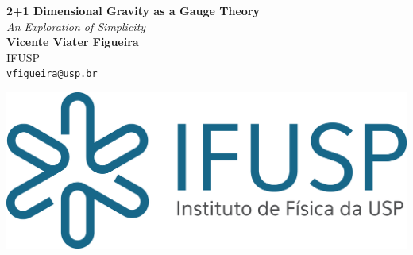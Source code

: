 \documentclass[a0,portrait]{a0poster}
\begin{document}
\nocite{*}



\begin{minipage}[b]{0.71\linewidth}
\veryHuge \color{NavyBlue} \textbf{2+1 Dimensional Gravity as a Gauge Theory} \color{Black}\\ %
\Huge\textit{An Exploration of Simplicity}\\[2cm] %
\huge \textbf{Vicente Viater Figueira}\\[0.5cm] %
\huge IFUSP\\[0.4cm] %
\Large \texttt{vfigueira@usp.br}\\
\end{minipage}
%
\begin{minipage}[b]{0.29\linewidth}
\includegraphics[width=20cm]{logohorizontalifusp.png}\\
\vspace{3cm}
\end{minipage}

\vspace{1cm} %

\end{document}
